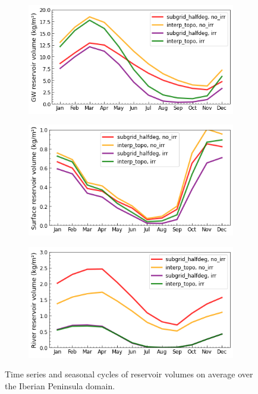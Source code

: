 \begin{figure}[htbp]
    \begin{subfigure}[b]{0.32\textwidth}
        \caption{}
        \includegraphics[width=\linewidth]{images/eval_halfdeg/time_series/slowr_seasonal_cycle.png}
    \end{subfigure}
    \begin{subfigure}[b]{0.32\textwidth}
        \caption{}
        \includegraphics[width=\linewidth]{images/eval_halfdeg/time_series/fastr_seasonal_cycle.png}
    \end{subfigure}
    \begin{subfigure}[b]{0.32\textwidth}
        \caption{}
        \includegraphics[width=\linewidth]{images/eval_halfdeg/time_series/streamr_seasonal_cycle.png}
    \end{subfigure}
    \caption{Time series and seasonal cycles of reservoir volumes on average over the Iberian Peninsula domain.}
    \label{fig:reservoir_time_series}
\end{figure}

